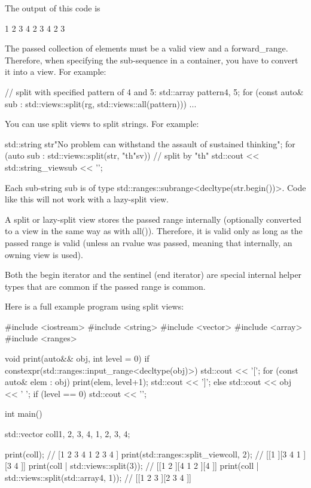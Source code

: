 The output of this code is

\begin{shell}
1 2 3 4
2 3 4
2 3
\end{shell}

The passed collection of elements must be a valid view and a forward\_range. Therefore, when specifying the sub-sequence in a container, you have to convert it into a view. For example:

\begin{cpp}
// split with specified pattern of 4 and 5:
std::array pattern{4, 5};
for (const auto& sub : std::views::split(rg, std::views::all(pattern))) {
	...
}
\end{cpp}

You can use split views to split strings. For example:

\begin{cpp}
std::string str{"No problem can withstand the assault of sustained thinking"};
for (auto sub : std::views::split(str, "th"sv)) { // split by "th"
	std::cout << std::string_view{sub} << '\n';
}
\end{cpp}

Each sub-string sub is of type std::ranges::subrange<decltype(str.begin())>. Code like this will not work with a lazy-split view.

A split or lazy-split view stores the passed range internally (optionally converted to a view in the same way as with all()). Therefore, it is valid only as long as the passed range is valid (unless an rvalue was passed, meaning that internally, an owning view is used).

Both the begin iterator and the sentinel (end iterator) are special internal helper types that are common if the passed range is common.

Here is a full example program using split views:


\begin{cpp}
#include <iostream>
#include <string>
#include <vector>
#include <array>
#include <ranges>

void print(auto&& obj, int level = 0)
{
	if constexpr(std::ranges::input_range<decltype(obj)>) {
		std::cout << '[';
		for (const auto& elem : obj) {
			print(elem, level+1);
		}
		std::cout << ']';
	}
	else {
		std::cout << obj << ' ';
	}
	if (level == 0) std::cout << '\n';
}

int main()
{
	std::vector coll{1, 2, 3, 4, 1, 2, 3, 4};
	
	print(coll); // [1 2 3 4 1 2 3 4 ]
	print(std::ranges::split_view{coll, 2}); // [[1 ][3 4 1 ][3 4 ]]
	print(coll | std::views::split(3)); // [[1 2 ][4 1 2 ][4 ]]
	print(coll | std::views::split(std::array{4, 1})); // [[1 2 3 ][2 3 4 ]]
}
\end{cpp}

